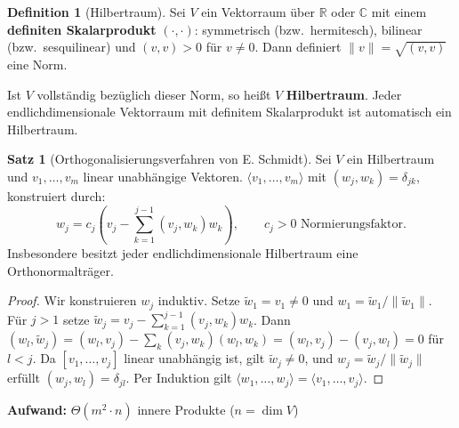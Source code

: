 ﻿\documentclass[a4paper,12pt]{report}
\theoremstyle{definition}
\newtheorem{definition}{Definition}
\newtheorem{satz}{Satz}
\begin{document}
\begin{definition}[Hilbertraum]
    Sei $V$ ein Vektorraum über $\mathbb{R}$ oder $\mathbb{C}$ mit einem
    \textbf{definiten Skalarprodukt} $(\cdot, \cdot)$: symmetrisch (bzw.\
    hermitesch), bilinear (bzw.\ sesquilinear) und $(v,v) > 0$ für $v \neq 0$.
    Dann definiert $\|v\| = \sqrt{(v,v)}$ eine Norm.

    Ist $V$ vollständig bezüglich dieser Norm, so heißt $V$
    \textbf{Hilbertraum}. Jeder endlichdimensionale Vektorraum mit
    definitem Skalarprodukt ist automatisch ein Hilbertraum.
\end{definition}

\begin{satz}[Orthogonalisierungsverfahren von E. Schmidt]
    Sei $V$ ein Hilbertraum und $v_1, \dots, v_m$
    linear unabhängige Vektoren.
    $\langle v_1, \dots, v_m \rangle$ mit $(w_j, w_k) = \delta_{jk}$,
    konstruiert durch:
    \[
        w_j = c_j \!\left(v_j - \sum_{k=1}^{j-1} (v_j, w_k) w_k\right),
        \qquad c_j > 0 \text{ Normierungsfaktor.}
    \]
    Insbesondere besitzt jeder endlichdimensionale Hilbertraum eine
    Orthonormalträger.
\end{satz}
\begin{proof}
    Wir konstruieren $w_j$ induktiv. Setze $\tilde{w}_1 = v_1 \neq 0$ und
    $w_1 = \tilde{w}_1 / \|\tilde{w}_1\|$.
    Für $j > 1$ setze $\tilde{w}_j = v_j - \sum_{k=1}^{j-1} (v_j, w_k) w_k$.
    Dann $(w_l, \tilde{w}_j) = (w_l, v_j) - \sum_k (v_j, w_k)(w_l, w_k)
    = (w_l, v_j) - (v_j, w_l) = 0$ für $l < j$.
    Da $[v_1, \ldots, v_j]$ linear unabhängig ist, gilt $\tilde{w}_j \neq 0$,
    und $w_j = \tilde{w}_j / \|\tilde{w}_j\|$ erfüllt $(w_j, w_l) = \delta_{jl}$.
    Per Induktion gilt $\langle w_1, \ldots, w_j \rangle = \langle v_1, \ldots, v_j \rangle$.
\end{proof}


\begin{algorithm}[H]
\DontPrintSemicolon
\caption{Gram-Schmidt-Orthogonalisierung}\label{alg:schmidt}
\;
\BlankLine
\textbf{Aufwand:} $\Theta(m^2 \cdot n)$ innere Produkte ($n = \dim V$)
\end{algorithm}
\end{document}
